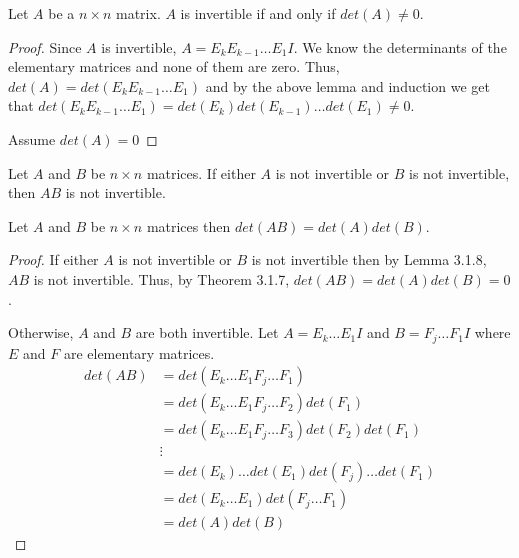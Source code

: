 \begin{theorem}
    Let $A$ be a $n\times n$ matrix. $A$ is invertible if and only if $det(A)\neq 0$.
\end{theorem}
\begin{proof}
    Since $A$ is invertible, $A=E_kE_{k-1}\ldots E_1 I$. We know the determinants of the elementary matrices and none of them are zero. Thus, $det(A)=det(E_k E_{k-1}\ldots E_1)$ and by the above lemma and induction we get that $det(E_k E_{k-1}\ldots E_1)=det(E_k)det(E_{k-1})\ldots det(E_1)\neq 0$.

    Assume $det(A)=0$
\end{proof}
\begin{lemma}
    Let $A$ and $B$ be $n\times n$ matrices. If either $A$ is not invertible or $B$ is not invertible, then $AB$ is not invertible.
\end{lemma}
\begin{theorem}
    Let $A$ and $B$ be $n\times n$ matrices then $det(AB)=det(A)det(B)$.
\end{theorem}
\begin{proof}
    If either $A$ is not invertible or $B$ is not invertible then by Lemma 3.1.8, $AB$ is not invertible. Thus, by Theorem 3.1.7, $det(AB)=det(A)det(B)=0$.

    Otherwise, $A$ and $B$ are both invertible. Let $A=E_k\ldots E_1I$ and $B=F_j\ldots F_1I$ where $E$ and $F$ are elementary matrices.
    \begin{align*}
        det(AB)&=det(E_k\ldots E_1 F_j\ldots F_1)\\
        &=det(E_k\ldots E_1F_j\ldots F_2)det(F_1)\tag{by Lemma 18.6}\\
        &=det(E_k\ldots E_1F_j\ldots F_3)det(F_2)det(F_1)\tag{by Lemma 18.6}\\
        &\vdots\\
        &=det(E_k)\ldots det(E_1)det(F_j)\ldots det(F_1)\\
        &=det(E_k\ldots E_1)det(F_j\ldots F_1)\\
        &=det(A)det(B)
    \end{align*}
\end{proof}
